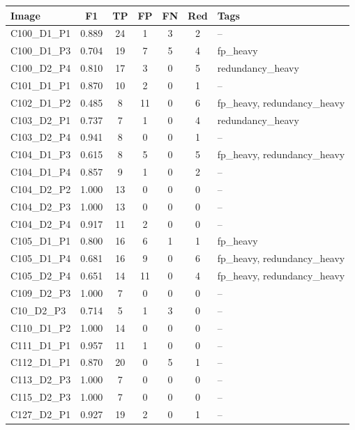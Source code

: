 {\scriptsize
\setlength{\tabcolsep}{4pt}
\begin{tabular}{p{2.6cm}ccccc p{4.8cm}}
\toprule
Image & F1 & TP & FP & FN & Red & Tags \\
\midrule
 C100\_D1\_P1 & 0.889 & 24 & 1 & 3 & 2 & -- \\
 C100\_D1\_P3 & 0.704 & 19 & 7 & 5 & 4 & fp\_heavy \\
 C100\_D2\_P4 & 0.810 & 17 & 3 & 0 & 5 & redundancy\_heavy \\
 C101\_D1\_P1 & 0.870 & 10 & 2 & 0 & 1 & -- \\
 C102\_D1\_P2 & 0.485 & 8 & 11 & 0 & 6 & fp\_heavy, redundancy\_heavy \\
 C103\_D2\_P1 & 0.737 & 7 & 1 & 0 & 4 & redundancy\_heavy \\
 C103\_D2\_P4 & 0.941 & 8 & 0 & 0 & 1 & -- \\
 C104\_D1\_P3 & 0.615 & 8 & 5 & 0 & 5 & fp\_heavy, redundancy\_heavy \\
 C104\_D1\_P4 & 0.857 & 9 & 1 & 0 & 2 & -- \\
 C104\_D2\_P2 & 1.000 & 13 & 0 & 0 & 0 & -- \\
 C104\_D2\_P3 & 1.000 & 13 & 0 & 0 & 0 & -- \\
 C104\_D2\_P4 & 0.917 & 11 & 2 & 0 & 0 & -- \\
 C105\_D1\_P1 & 0.800 & 16 & 6 & 1 & 1 & fp\_heavy \\
 C105\_D1\_P4 & 0.681 & 16 & 9 & 0 & 6 & fp\_heavy, redundancy\_heavy \\
 C105\_D2\_P4 & 0.651 & 14 & 11 & 0 & 4 & fp\_heavy, redundancy\_heavy \\
 C109\_D2\_P3 & 1.000 & 7 & 0 & 0 & 0 & -- \\
 C10\_D2\_P3 & 0.714 & 5 & 1 & 3 & 0 & -- \\
 C110\_D1\_P2 & 1.000 & 14 & 0 & 0 & 0 & -- \\
 C111\_D1\_P1 & 0.957 & 11 & 1 & 0 & 0 & -- \\
 C112\_D1\_P1 & 0.870 & 20 & 0 & 5 & 1 & -- \\
 C113\_D2\_P3 & 1.000 & 7 & 0 & 0 & 0 & -- \\
 C115\_D2\_P3 & 1.000 & 7 & 0 & 0 & 0 & -- \\
 C127\_D2\_P1 & 0.927 & 19 & 2 & 0 & 1 & -- \\
\bottomrule
\end{tabular}
}